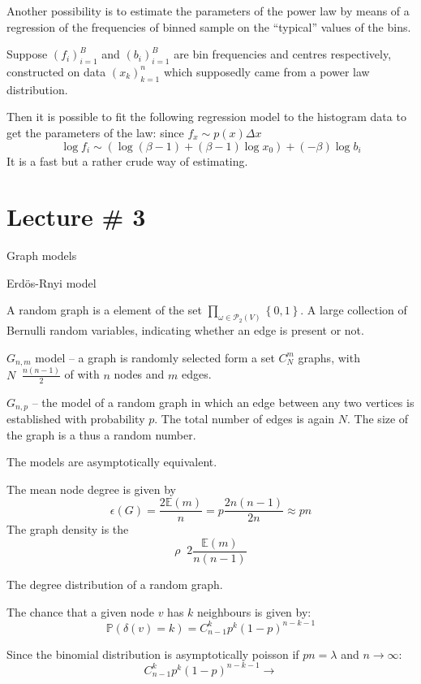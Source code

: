 \documentclass[a4paper]{article}
\newcommand{\obj}[1]{{\left\{ #1 \right \}}}
\newcommand{\brac}[1]{{\left ( #1 \right )}}
\newcommand{\Pwr}{\mathcal{P}}
\newcommand{\pr}{\mathbb{P}}
\newcommand{\ex}{\mathbb{E}}
\newcommand{\defn}{\mathop{\overset{\Delta}{=}}\nolimits}
\begin{document}
Another possibility is to estimate the parameters of the power law by means of a regression of the frequencies of binned sample on the ``typical'' values of the bins.

Suppose $\brac{f_i}_{i=1}^B$ and $\brac{b_i}_{i=1}^B$ are bin frequencies and centres respectively, constructed on data $\brac{x_k}_{k=1}^n$ which supposedly came from a power law distribution.

Then it is possible to fit the following regression model to the histogram data to get the parameters of the law:
since $f_x \sim p(x) \Delta x$
\[\log f_i \sim \brac{\log{(\beta-1)} + (\beta-1) \log x_0} + (-\beta) \log b_i\]
It is a fast but a rather crude way of estimating.



\section{Lecture \# 3} %
\label{sec:lecture_3}

Graph models

Erd\"os-Rnyi model

A random graph is a element of the set $\prod_{\omega\in \Pwr_2(V)} \obj{0,1}$.
A large collection of Bernulli random variables, indicating whether an edge is present or not.

$G_{n,m}$ model -- a graph is randomly selected form a set  $C_N^m$ graphs, with $N\defn \frac{n(n-1)}{2}$ of with $n$ nodes and $m$ edges.

$G_{n,p}$ -- the model of a random graph in which an edge between
any two vertices is established with probability $p$. The total
number of edges is again $N$. The size of the graph is a thus a
random number.

The models are asymptotically equivalent.

The mean node degree is given by
\[\epsilon(G) = \frac{2 \ex(m)}{n} = p\frac{2 n(n-1)}{2 n} \approx p n\]
The graph density is the \[\rho \defn 2\frac{\ex(m)}{n(n-1)}\]

The degree distribution of a random graph.

The chance that a given node $v$ has $k$ neighbours is given by:
\[\pr\brac{\delta(v) = k} = C^k_{n-1} p^k \brac{1-p}^{n-k-1}\]

Since the binomial distribution is asymptotically poisson if $p n = \lambda$ and $n\to \infty$:
\[C^k_{n-1} p^k \brac{1-p}^{n-k-1} \to \]
\end{document}
